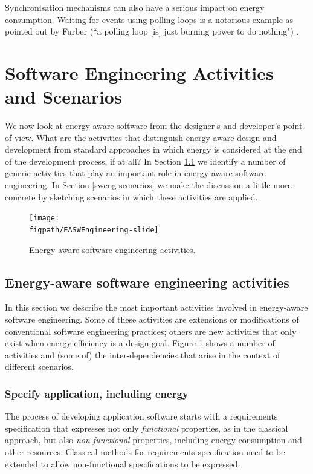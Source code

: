 \documentclass[oneside]{book}
\newcommand{\figpath}{Figs}
\begin{document}
Synchronisation mechanisms can also have a serious impact on energy consumption. Waiting for events using polling loops is a notorious example as pointed out by Furber (``a polling loop [is] just burning power to do nothing") \cite{Furber2016}.





\section{Software Engineering Activities and Scenarios}
\label{ea-sw-eng}


We now look at energy-aware software from the designer's and developer's point of view.
What are the activities that distinguish energy-aware design and development from
standard approaches in which energy is considered at the end of the development process, if at all?
In Section \ref{sweng-activities} we identify a number of generic activities that play an
important role in energy-aware software engineering.  In Section \ref{sweng-scenarios} we make the discussion
a little more concrete by sketching scenarios in which these activities are applied.
\begin{figure}
\centerline{\texttt{[image: \\figpath/EASWEngineering-slide]}}
\vspace{-1.5cm}
\caption{Energy-aware software engineering activities.}
\label{fig:EASWEngineering}
\end{figure}


\subsection{Energy-aware software engineering activities}\label{sweng-activities}

In this section we describe the most important activities involved in
energy-aware software engineering.  Some of these activities are
extensions or modifications of conventional software engineering
practices; others are new activities that only exist when energy
efficiency is a design goal.  Figure \ref{fig:EASWEngineering} shows a
number of activities and (some of) the inter-dependencies that arise
in the context of different scenarios.

\subsubsection{Specify application, including energy}
The process of developing application software starts with a
requirements specification that expresses not only \emph{functional} properties, as
in the classical approach, but also \emph{non-functional} properties,
including energy consumption and other resources.  Classical
methods for requirements specification need to be extended to allow
non-functional specifications to be expressed. 
\end{document}
